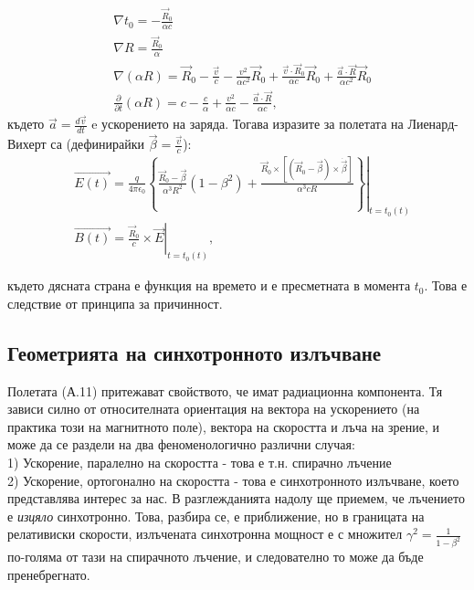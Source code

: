 \begin{appendices}
\begin{equation}
		\begin{split}
			&\nabla t_0 = -\frac{\vec{R}_0}{\alpha c}\\
			&\nabla R = \frac{\vec{R}_0}{\alpha}\\
			&\nabla(\alpha R) = \vec{R}_0 - \frac{\vec{v}}{c} - \frac{v^2}{\alpha c^2}\vec{R}_0 + \frac{\vec{v}\cdot\vec{R}_0}{\alpha c}\vec{R}_0 + \frac{\vec{a}\cdot \vec{R}}{\alpha c^2} \vec{R}_0\\
			&\frac{\partial}{\partial t}(\alpha R) = c - \frac{c}{\alpha} + \frac{v^2}{\alpha c} - \frac{\vec{a}\cdot\vec{R}}{\alpha c},
		\end{split}
	\end{equation}
	където $\vec{a} = \frac{d \vec{v}}{dt}$ e ускорението на заряда. Тогава изразите за полетата на Лиенард-Вихерт са (дефинирайки $\vec{\beta} = \frac{\vec{v}}{c}$):
	\begin{equation}\label{LW_fields}
		\begin{split}
			&\vec{E(t)} =\left. \frac{q}{4\pi\epsilon_0}\left\{\frac{\vec{R}_0 - \vec{\beta}}{\alpha^3 R^2}\left(1 - \beta^2\right) + \frac{\vec{R}_0 \times \left[\left(\vec{R}_0 - \vec{\beta}\right)\times\dot{\vec{\beta}}\right]}{\alpha^3 c R}\right\}\right\vert_{t = t_0(t)}\\
			&\vec{B(t)} = \left. \frac{\vec{R}_0}{c}\times\vec{E}\right\vert_{t = t_0(t)},
		\end{split}
	\end{equation}
	
където дясната страна е функция на времето и е пресметната в момента $t_0$. Това е следствие от принципа за причинност. 
\newpage
\subsection{Геометрията на синхотронното излъчване}	
Полетата (А.11) притежават свойството, че имат радиационна компонента. Тя зависи силно от относителната ориентация на вектора на ускорението (на практика този на магнитното поле), вектора на скоростта и лъча на зрение, и може да се раздели на два феноменологично различни случая:\\

1) Ускорение, паралелно на скоростта - това е т.н. спирачно лъчение\\

2) Ускорение, ортогонално на скоростта - това е синхотронното излъчване, което представлява интерес за нас. В разглежданията надолу ще приемем, че лъчението е \emph{изцяло} синхотронно. Това, разбира се, е приближение, но в границата на релативиски скорости, излъчената синхотронна мощност е с множител $\gamma^2 = \frac{1}{1 - \beta^2}$ по-голяма от тази на спирачното лъчение, и следователно то може да бъде пренебрегнато.\\


\end{appendices}

